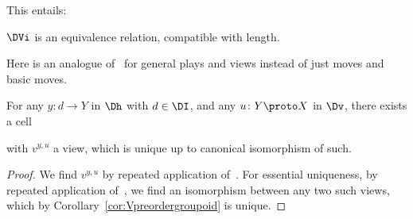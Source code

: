 \documentclass{LMCS}
\theoremstyle{plain}\newtheorem{satz}[thm]{Satz}
\begin{document}
This entails:
\begin{cor}\label{cor:Vpreordergroupoid}
  $\DVi$ is an equivalence relation, compatible with length.
\end{cor}

Here is an analogue of~ for general plays and views
instead of just moves and basic moves.
\begin{prop}\label{prop:views}
For any $y \colon d \to Y$ in $\Dh$ with $d\in \DI$,
    and any $u \colon Y \proto X$ in $\Dv$, there exists a cell
\begin{center}
\end{center}
with $v^{y,u}$ a view, which is unique up to canonical isomorphism of
such.   
\end{prop}

\begin{proof}
  We find $v^{y,u}$ by repeated application of~.  For
  essential uniqueness, by repeated application of~, 
  we find an isomorphism between any two such views, which 
  by Corollary~\ref{cor:Vpreordergroupoid} is unique.
\end{proof}
\end{document}
